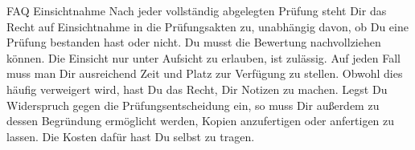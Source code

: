 \begin{artikel}{FAQ Einsichtnahme}
Nach jeder vollständig abgelegten Prüfung steht Dir das Recht auf Einsichtnahme in die Prüfungsakten zu, unabhängig davon, ob Du eine Prüfung bestanden hast oder nicht. Du musst die Bewertung nachvollziehen können. Die Einsicht nur unter Aufsicht zu erlauben, ist zulässig. Auf jeden Fall muss man Dir ausreichend Zeit und Platz zur Verfügung zu stellen. Obwohl dies häufig verweigert wird, hast Du das Recht, Dir Notizen zu machen. Legst Du Widerspruch gegen die Prüfungsentscheidung ein, so muss Dir außerdem zu dessen Begründung ermöglicht werden, Kopien anzufertigen oder anfertigen zu lassen. Die Kosten dafür hast Du selbst zu tragen.
\end{artikel}
